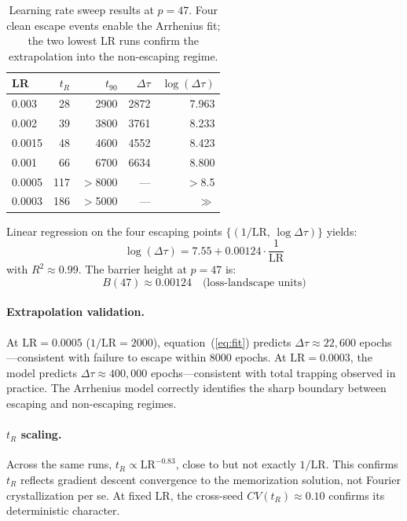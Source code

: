 \documentclass[11pt,twocolumn]{article}
\begin{document}
\begin{table}[H]
\centering
\small
\begin{tabular}{@{}lrrrr@{}}
\toprule
LR & $t_R$ & $t_{90}$ & $\Delta\tau$ & $\log(\Delta\tau)$ \\
\midrule
0.003  & 28  & 2900 & 2872  & 7.963 \\
0.002  & 39  & 3800 & 3761  & 8.233 \\
0.0015 & 48  & 4600 & 4552  & 8.423 \\
0.001  & 66  & 6700 & 6634  & 8.800 \\
0.0005 & 117 & $>$8000 & ---  & $>$8.5 \\
0.0003 & 186 & $>$5000 & ---  & $\gg$ \\
\bottomrule
\end{tabular}
\caption{Learning rate sweep results at $p=47$. Four clean escape events enable the Arrhenius fit; the two lowest LR runs confirm the extrapolation into the non-escaping regime.}
\label{tab:arrhenius}
\end{table}

Linear regression on the four escaping points $\{(1/\mathrm{LR},\, \log \Delta\tau)\}$ yields:
\begin{equation}
\log(\Delta\tau) = 7.55 + 0.00124 \cdot \frac{1}{\mathrm{LR}}
\label{eq:fit}
\end{equation}
with $R^2 \approx 0.99$. The barrier height at $p=47$ is:
\begin{equation}
B(47) \approx 0.00124 \quad \text{(loss-landscape units)}
\end{equation}

\paragraph{Extrapolation validation.} At $\mathrm{LR}=0.0005$ ($1/\mathrm{LR}=2000$), equation~(\ref{eq:fit}) predicts $\Delta\tau \approx 22{,}600$ epochs---consistent with failure to escape within 8000 epochs. At $\mathrm{LR}=0.0003$, the model predicts $\Delta\tau \approx 400{,}000$ epochs---consistent with total trapping observed in practice. The Arrhenius model correctly identifies the sharp boundary between escaping and non-escaping regimes.

\paragraph{$t_R$ scaling.} Across the same runs, $t_R \propto \mathrm{LR}^{-0.83}$, close to but not exactly $1/\mathrm{LR}$. This confirms $t_R$ reflects gradient descent convergence to the memorization solution, not Fourier crystallization per se. At fixed LR, the cross-seed $CV(t_R) \approx 0.10$ confirms its deterministic character.
\end{document}
